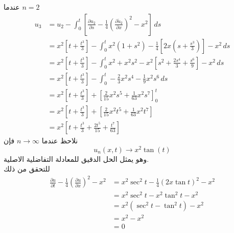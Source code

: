 عندما $n=2$ 
\begin{align*}
		u_{3} &= u_2 - \int_{0}^{t}  \left[\frac{\partial u_2}{\partial s} - \frac{1}{4}\left(\frac{\partial \tilde{u}_2}{\partial x}\right)^2 - x^2\right] \, ds\\
		&= x^2\left[t + \frac{t^3}{3}\right] - \int_{0}^{t} x^2(1+s^2) - \frac{1}{4}\left[2x(s + \frac{s^3}{3})\right] - x^2\,ds\\
		&= x^2\left[t + \frac{t^3}{3}\right] - \int_{0}^{t} x^2 + x^2s^2 - x^2 \left[s^2+\frac{2s^4}{3} + \frac{s^6}{9}\right] - x^2\, ds\\
		&= x^2\left[t + \frac{t^3}{3}\right]  - \int_{0}^{t} -\frac{2}{3} x^2 s^4 - \frac{1}{9} x^2s^6 \, ds\\
		&= x^2\left[t + \frac{t^3}{3}\right] + \left[\frac{2}{15}x^2s^5 + \frac{1}{63} x^2s^7\right]^t_0\\
		&= x^2\left[t + \frac{t^3}{3}\right] + \left[\frac{2}{15}x^2t^5 + \frac{1}{63} x^2t^7\right]\\
		&= x^2 \left[t + \frac{t^3}{3} + \frac{2t^5}{15} + \frac{t^7}{63}\right]
\end{align*}
نلاحظ عندما $n\to \infty$ فإن 
\[
u_n(x, t) \to x^2 \tan(t)
\]
وهو يمثل الحل الدقيق للمعادلة التفاضلية الاصلية.\\
للتحقق من ذلك 
\begin{align*}
	\frac{\partial u}{\partial t} - \frac{1}{4} \left(\frac{\partial u}{\partial x}\right)^2 - x^2 &= x^2\sec^2 t - \frac{1}{4}\left(2x\tan t\right)^2 - x^2\\
	&= x^2 \sec^2 t - x^2\tan^2 t - x^2\\
	&= x^2 (\sec^2 t - \tan^2 t) - x^2\\
	& = x^2 - x^2\\
	&=0 
\end{align*}

